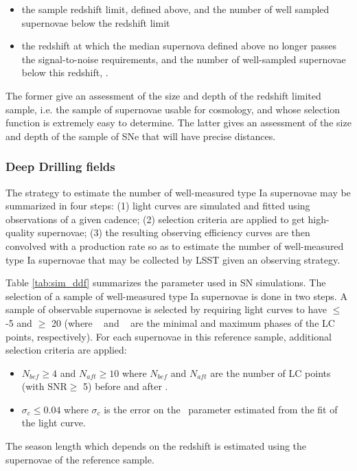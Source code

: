 \begin{itemize}
\item the sample redshift limit, \zfaint defined above, and the number
  of well sampled supernovae below the redshift limit \nsnfaint
\item the redshift \zmed at which the median supernova defined above
  no longer passes the signal-to-noise requirements, and the number of
  well-sampled supernovae below this redshift, \nsnmed.  
\end{itemize}
The former give an assessment of the size and depth of the redshift
limited sample, i.e. the sample of supernovae usable for cosmology,
and whose selection function is extremely easy to determine.  The
latter gives an assessment of the size and depth of the sample of SNe
that will have precise distances.

\subsubsection{Deep Drilling fields}


The strategy to estimate the number of well-measured type Ia supernovae may be summarized in four steps: (1) light curves are simulated and fitted using observations of a given cadence; (2) selection criteria are applied to get high-quality supernovae; (3) the resulting observing efficiency curves are then convolved with a production rate \cite{perrett} so as to estimate the number of well-measured type Ia supernovae that may be collected by LSST given an observing strategy. 

Table \ref{tab:sim_ddf} summarizes the parameter used in SN simulations. The selection of a sample of well-measured type Ia supernovae is done in two steps. A sample of observable supernovae is selected by requiring light curves to have \phasemin $\leq$ -5 and \phasemax $\geq$ 20 (where \phasemin~ and \phasemax~ are the minimal and maximum phases of the LC points, respectively). For each supernovae in this reference sample, additional selection criteria are applied:
\begin{itemize}
\item $N_{bef} \geq 4$ and $N_{aft} \geq 10$ where $N_{bef}$ and $N_{aft}$ are the number of LC points (with SNR$\geq$ 5) before and after \daymax.
 \item $\sigma_c \leq 0.04$ where $\sigma_c$ is the error on the \sncolor~parameter estimated from the fit of the light curve.
\end{itemize}
The season length which depends on the redshift is estimated using the supernovae of the reference sample.

